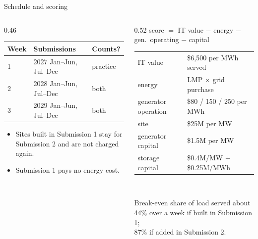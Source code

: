 \documentclass[aspectratio=169,11pt]{beamer}
\begin{document}
\begin{frame}{Schedule and scoring}
  \small
  \begin{columns}[T,onlytextwidth]
    \begin{column}{0.46\textwidth}
      \begin{tabular}{@{}lll@{}}
        \toprule
        Week & Submissions & Counts?\\
        \midrule
        1 & 2027 Jan--Jun, Jul--Dec & practice\\
        2 & 2028 Jan--Jun, Jul--Dec & both\\
        3 & 2029 Jan--Jun, Jul--Dec & both\\
        \bottomrule
      \end{tabular}
      \vspace{0.6em}
      \begin{itemize}
        \item Sites built in Submission 1 stay for Submission 2 and are
          \alert{not charged again}.
        \item Submission 1 pays no energy cost.
      \end{itemize}
    \end{column}
    \begin{column}{0.52\textwidth}
      \centering
      score $=$ IT value $-$ energy $-$ gen.\ operating $-$ capital\\[0.5em]
      \footnotesize
      \begin{tabular}{@{}ll@{}}
        \toprule
        IT value & \$6{,}500 per MWh served\\
        energy & LMP $\times$ grid purchase\\
        generator operation & \$80 / 150 / 250 per MWh\\
        site & \$25M per MW\\
        generator capital & \$1.5M per MW\\
        storage capital & \$0.4M/MW $+$ \$0.25M/MWh\\
        \bottomrule
      \end{tabular}\\[0.6em]
      \begin{block}{Break-even share of load served}
        about 44\% over a week if built in Submission 1;\\
        87\% if added in Submission 2.
      \end{block}
    \end{column}
  \end{columns}
\end{frame}
\end{document}
